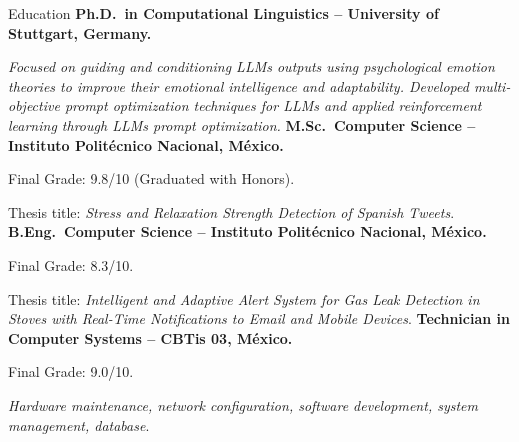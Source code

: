 \begin{rubric}{Education}
\entry*[2021 -- 2024 ]%
	\textbf{Ph.D.~in Computational Linguistics -- University of Stuttgart, Germany.} \par
    \textit{Focused on guiding and conditioning LLMs outputs using psychological emotion theories to improve their emotional intelligence and adaptability. Developed multi-objective prompt optimization techniques for LLMs and applied reinforcement learning through LLMs prompt optimization.}
%
\entry*[2015 -- 2017]%
	\textbf{M.Sc.~Computer Science -- Instituto Politécnico Nacional, México.}\par
    Final Grade: 9.8/10 (Graduated with Honors).\par
	Thesis title: \textit{Stress and Relaxation Strength Detection of Spanish Tweets}.
% 
\entry*[2011 -- 2015]%
	\textbf{B.Eng.~Computer Science -- Instituto Politécnico Nacional, México.}\par
    Final Grade: 8.3/10.\par
	Thesis title: \textit{Intelligent and Adaptive Alert System for Gas Leak Detection in Stoves with Real-Time Notifications to Email and Mobile Devices}.
%
\entry*[2008 -- 2011]%
    \textbf{Technician in Computer Systems -- CBTis 03, México.}\par
    Final Grade: 9.0/10.\par
	\textit{Hardware maintenance, network configuration, software development, system management, database}.
\end{rubric}